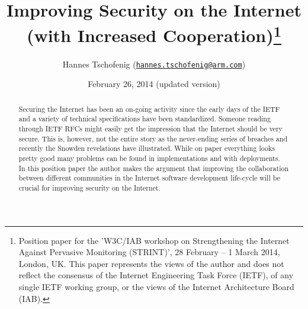 \documentclass[peerreview, a4paper, 7pt]{IEEEtran}
\title{Improving Security on the Internet \\(with Increased Cooperation)\thanks{Position paper for the 'W3C/IAB workshop on Strengthening the Internet Against Pervasive Monitoring (STRINT)', 28 February – 1 March 2014, London, UK. This paper represents the views of the author and does not reflect the consensus of the Internet Engineering Task Force (IETF), of any single IETF working group, or the views of the Internet Architecture Board (IAB).}}
\author{Hannes Tschofenig (\texttt{\href{mailto:hannes.tschofenig@arm.com}{hannes.tschofenig@arm.com}})}
\date{February 26, 2014 (updated version)}
\begin{document}
\maketitle


\begin{abstract}

Securing the Internet has been an on-going activity since the early days of the IETF and a variety of technical specifications have been standardized. 
Someone reading through IETF RFCs might easily get the impression that the Internet should be very secure. This is, however, not the entire story as the never-ending series of breaches and recently the Snowden revelations have illustrated. While on paper everything looks pretty good many problems can be found in implementations and with deployments.\\

In this position paper the author makes the argument that improving the collaboration between different communities in the Internet software development life-cycle will be crucial for improving security on the Internet. 






\end{abstract}
\end{document}
